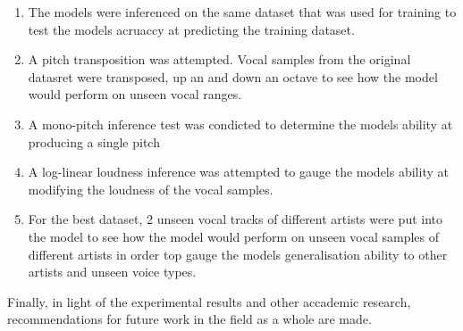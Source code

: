 \begin{enumerate}
    \item The models were inferenced on the same dataset that was used for training to test the models acruaccy at predicting the training dataset.
    \item A pitch transposition was attempted. Vocal samples from the original datasret were transposed, up an and down an octave to see how the model would perform on unseen vocal ranges.
    \item A mono-pitch inference test was condicted to determine the models ability at producing a single pitch
    \item A log-linear loudness inference was attempted to gauge the models ability at modifying the loudness of the vocal samples.
    \item For the best dataset, 2 unseen vocal tracks of different artists were put into the model to see how the model would perform on unseen vocal samples of different artists in order top gauge the models generalisation ability to other artists and unseen voice types.
\end{enumerate}

Finally, in light of the experimental results and other accademic research, recommendations for future work in the field as a whole are made.